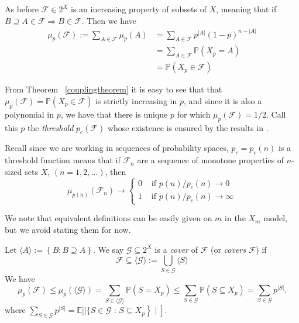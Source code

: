\documentclass[12pt,oneside,reqno]{amsart}
\theoremstyle{definition}
\numberwithin{equation}{theorem}
\newcommand{\PP}{{\mathbb P}}%
\newcommand{\cF}{{\mathcal F}}
\newcommand{\cG}{{\mathcal G}}
\begin{document}
As before $\cF \in 2^X$ is an increasing property of subsets of $X$, meaning that if ${B \supseteq A \in \mathcal{F} \Rightarrow B \in \mathcal{F}}$. Then we have 
$$\begin{aligned} \mu_p(\cF):=\sum_{A \in \cF} \mu_p(A) & =\sum_{A \in \cF} p^{|A|}(1-p)^{n-|A|} \\ 
& =\sum_{A \in \cF} \mathbb{P}\left(X_p=A\right) \\ 
& =\mathbb{P}\left(X_p \in \cF\right)\end{aligned}$$

From Theorem ~\ref{couplingtheorem} it is easy to see that that $\mu_p(\cF) = \mathbb{P}\left(X_p \in \cF\right)$ is strictly increasing in $p$, and since it is also a polynomial in $p$, we have that there is unique $p$ for which $\mu_p(\cF) = 1/2$. Call this $p$ the \emph{threshold} $p_c(\cF)$ whose existence is ensured by the results in \cite{tf}.

Recall since we are working in sequences of probability spaces, $p_c = p_c(n)$ is a threshold function means that if $\cF_n$ are a sequence of monotone properties of $n$-sized sets $X$, $(n=1,2, \ldots)$, then
$$
\mu_{p(n)}\left(\mathcal{F}_n\right) \rightarrow \begin{cases}0 & \text { if } p(n) / p_c(n) \rightarrow 0 \\ 1 & \text { if } p(n) / p_c(n) \rightarrow \infty\end{cases}
$$


We note that equivalent definitions can be easily given on $m$ in the $X_m$ model, but we avoid stating them for now. 
\newline

Let  $\langle A \rangle:= \left\{B: B \supseteq A\right\}$. We say $\cG \subseteq 2^X$ is a \emph{cover} of $\cF$ (or \emph{covers} $\cF$) if 
\begin{equation}\label{cover}
\cF \subseteq \langle \cG \rangle := \bigcup_{S \in \cG} {\langle S \rangle}
\end{equation}
We have 
\begin{equation}\label{trivial}
\mu_{p}(\mathcal{F}) \leq \mu_{p}(\langle\mathcal{G}\rangle) = \sum_{S \in \langle\mathcal{G}\rangle}{\PP(S = X_p)} \leq  \sum_{S \in \cG}{\PP(S \subseteq X_p)}  = \sum_{S \in \mathcal{G}} p^{|S|} .
\end{equation}
where $\sum_{S \in \mathcal{G}} p^{|S|} = \mathbb{E}[\mid\{S \in \mathcal{G}$ : $\left.\left.S \subseteq X_{p}\right\} \mid\right]$. 
\\
\end{document}
